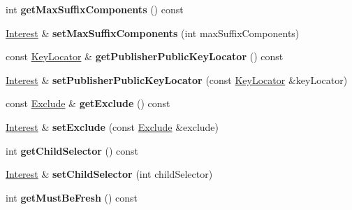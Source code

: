 \begin{DoxyCompactItemize}
\item 
int {\bfseries get\+Max\+Suffix\+Components} () const\hypertarget{classndn_1_1Interest_ac5e59f5667d7920221ad0c5a43e4a261}{}\label{classndn_1_1Interest_ac5e59f5667d7920221ad0c5a43e4a261}

\item 
\hyperlink{classndn_1_1Interest}{Interest} \& {\bfseries set\+Max\+Suffix\+Components} (int max\+Suffix\+Components)\hypertarget{classndn_1_1Interest_a8e3ba2699c0625ab9fca83a3e34d67fe}{}\label{classndn_1_1Interest_a8e3ba2699c0625ab9fca83a3e34d67fe}

\item 
const \hyperlink{classndn_1_1KeyLocator}{Key\+Locator} \& {\bfseries get\+Publisher\+Public\+Key\+Locator} () const\hypertarget{classndn_1_1Interest_a8eb662331ef3144fa3333fbc8c8c89ff}{}\label{classndn_1_1Interest_a8eb662331ef3144fa3333fbc8c8c89ff}

\item 
\hyperlink{classndn_1_1Interest}{Interest} \& {\bfseries set\+Publisher\+Public\+Key\+Locator} (const \hyperlink{classndn_1_1KeyLocator}{Key\+Locator} \&key\+Locator)\hypertarget{classndn_1_1Interest_abfd7de6cc5ee4618e25fee0ddb2bd823}{}\label{classndn_1_1Interest_abfd7de6cc5ee4618e25fee0ddb2bd823}

\item 
const \hyperlink{classndn_1_1Exclude}{Exclude} \& {\bfseries get\+Exclude} () const\hypertarget{classndn_1_1Interest_aa5c6c9bf1b170a005d30831545cb5984}{}\label{classndn_1_1Interest_aa5c6c9bf1b170a005d30831545cb5984}

\item 
\hyperlink{classndn_1_1Interest}{Interest} \& {\bfseries set\+Exclude} (const \hyperlink{classndn_1_1Exclude}{Exclude} \&exclude)\hypertarget{classndn_1_1Interest_a6311b9b8eb29a387ce26c095f1526de9}{}\label{classndn_1_1Interest_a6311b9b8eb29a387ce26c095f1526de9}

\item 
int {\bfseries get\+Child\+Selector} () const\hypertarget{classndn_1_1Interest_aa7552f9f6eb167291c5a64fa8eb9357a}{}\label{classndn_1_1Interest_aa7552f9f6eb167291c5a64fa8eb9357a}

\item 
\hyperlink{classndn_1_1Interest}{Interest} \& {\bfseries set\+Child\+Selector} (int child\+Selector)\hypertarget{classndn_1_1Interest_ae1c0c807ff5949a6e516b60bc6a45f6c}{}\label{classndn_1_1Interest_ae1c0c807ff5949a6e516b60bc6a45f6c}

\item 
int {\bfseries get\+Must\+Be\+Fresh} () const\hypertarget{classndn_1_1Interest_ae48c84506997f02a96933c22a32a8bdd}{}\label{classndn_1_1Interest_ae48c84506997f02a96933c22a32a8bdd}


\end{DoxyCompactItemize}
